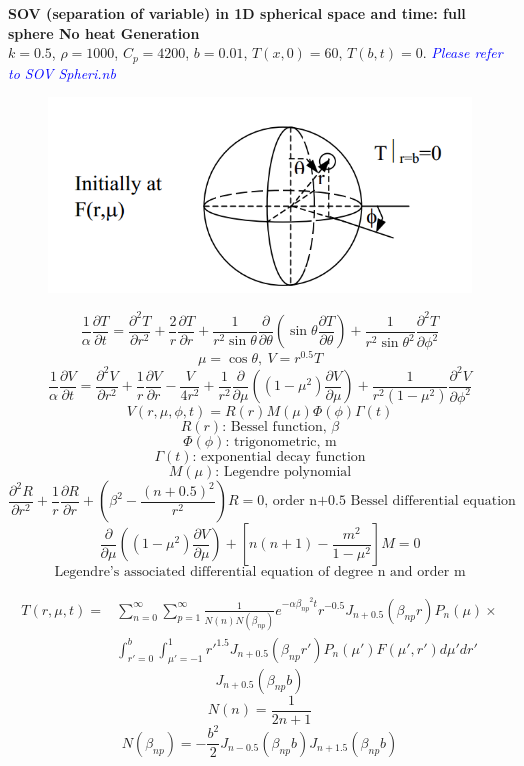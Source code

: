 \begin{appendices}
\begin{example}
\textbf{SOV (separation of variable) in 1D spherical space and time: full sphere No heat Generation}\\
$k = 0.5$, $\rho= 1000$, $C_p = 4200$, $b=0.01$, $T(x,0)=60$, $T(b,t)=0$.
\textcolor{blue} {\emph{Please refer to SOV Spheri.nb}}
\begin{figure}[H]
  \centering
    \includegraphics[scale=0.5]{figures/appendixA/7}
\end{figure}
$$ 
\frac{1}{\alpha}\frac{\partial T}{\partial t}=
\frac{\partial^2 T}{\partial r^2}+
\frac{2}{r}\frac{\partial T}{\partial r}+
\frac{1}{r^2\sin \theta} \frac{\partial}{\partial \theta}
\left( \sin\theta\frac{\partial T}{\partial \theta} \right)
+\frac{1}{r^2{\sin{\theta}}^2}\frac{\partial^2 T}{\partial \phi^2}
$$
$$\mu=\cos \theta,~V=r^{0.5}T$$
$$
\frac{1}{\alpha}\frac{\partial V}{\partial t}=
\frac{\partial^2 V}{\partial r^2}+
\frac{1}{r}\frac{\partial V}{\partial r}-
\frac{V}{4r^2}+
\frac{1}{r^2}\frac{\partial}{\partial \mu}
\left( (1-\mu^2)\frac{\partial V}{\partial \mu}\right)+
\frac{1}{r^2(1-\mu^2)}\frac{\partial^2 V}{\partial \phi^2}$$
$$V(r,\mu,\phi,t)=R(r)M(\mu)\Phi(\phi)\Gamma(t)$$
$$R(r)\text{: Bessel function, }\beta$$
$$\Phi(\phi)\text{: trigonometric, m}$$
$$\Gamma(t)\text{: exponential decay function}$$
$$M(\mu)\text{: Legendre polynomial}$$
$$ 
\frac{\partial^2 R}{\partial r^2}+
\frac{1}{r}\frac{\partial R}{\partial r}+
\left(\beta^2-\frac{(n+0.5)^2}{r^2}\right) R 
=0\text{, order n+0.5 Bessel differential equation}
$$
$$
\frac{\partial}{\partial \mu}
\left( (1-\mu^2)\frac{\partial V}{\partial \mu}\right)+
\left[ n(n+1)-\frac{m^2}{1-\mu^2} \right]M=0
$$
$$\text{Legendre’s associated differential equation of degree n and order m}$$

\begin{equation*}
\begin{aligned}
T(r,\mu,t)=&\sum_{n=0}^{\infty}\sum_{p=1}^{\infty} \frac{1}{N(n)N(\beta_{np})}
e^{-\alpha{\beta_{np}}^2t}r^{-0.5}J_{n+0.5}(\beta_{np}r)P_n(\mu)\times\\
&\int_{r'=0}^{b}\int_{\mu'=-1}^{1} {r'}^{1.5}J_{n+0.5}(\beta_{np}r')P_n(\mu')F(\mu',r')d\mu'dr'
\end{aligned}
\end{equation*}
$$J_{n+0.5}(\beta_{np}b)$$
$$N(n)=\frac{1}{2n+1}$$
$$N(\beta_{np})=-\frac{b^2}{2}J_{n-0.5}(\beta_{np}b)J_{n+1.5}(\beta_{np}b)$$
\end{example}


\end{appendices}
